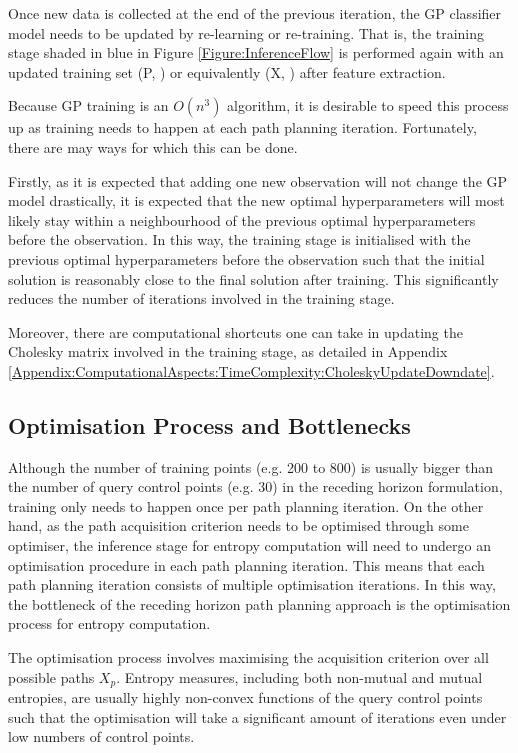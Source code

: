 			Once new data is collected at the end of the previous iteration, the GP classifier model needs to be updated by re-learning or re-training. That is, the training stage shaded in blue in Figure \ref{Figure:InferenceFlow} is performed again with an updated training set (P, ) or equivalently (X, ) after feature extraction.
			
			Because GP training is an $O(n^{3})$ algorithm, it is desirable to speed this process up as training needs to happen at each path planning iteration. Fortunately, there are may ways for which this can be done.
			
			Firstly, as it is expected that adding one new observation will not change the GP model drastically, it is expected that the new optimal hyperparameters will most likely stay within a neighbourhood of the previous optimal hyperparameters before the observation. In this way, the training stage is initialised with the previous optimal hyperparameters before the observation such that the initial solution is reasonably close to the final solution after training. This significantly reduces the number of iterations involved in the training stage.
			
			Moreover, there are computational shortcuts one can take in updating the Cholesky matrix involved in the training stage, as detailed in Appendix \ref{Appendix:ComputationalAspects:TimeComplexity:CholeskyUpdateDowndate}.
			
		\subsection{Optimisation Process and Bottlenecks}
		\label{InformativeSeafloorExploration:RecedingHorizonFormulation:OptimisationProcess}
	
			Although the number of training points (e.g. 200 to 800) is usually bigger than the number of query control points (e.g. 30) in the receding horizon formulation, training only needs to happen once per path planning iteration. On the other hand, as the path acquisition criterion needs to be optimised through some optimiser, the inference stage for entropy computation will need to undergo an optimisation procedure in each path planning iteration. This means that each path planning iteration consists of multiple optimisation iterations. In this way, the bottleneck of the receding horizon path planning approach is the optimisation process for entropy computation.
				
			The optimisation process involves maximising the acquisition criterion over all possible paths $X_{p}$. Entropy measures, including both non-mutual and mutual entropies, are usually highly non-convex functions of the query control points such that the optimisation will take a significant amount of iterations even under low numbers of control points.
			

